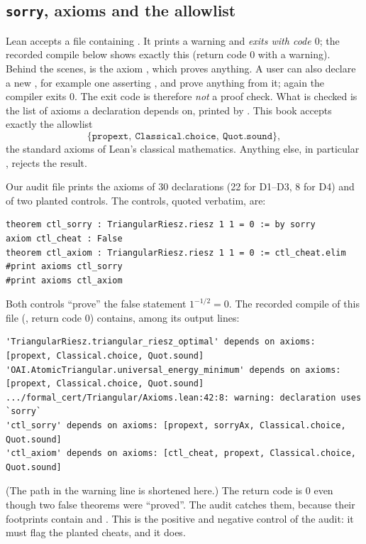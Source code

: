 \subsection{\texttt{sorry}, axioms and the allowlist}

Lean accepts a file containing . It prints a warning and \emph{exits with code $0$}; the recorded compile
below shows exactly this (return code $0$ with a  warning). Behind the scenes,
 is the axiom , which proves anything. A user can also declare a new , for example
one asserting , and prove anything from it; again the compiler exits $0$. The exit code is therefore
\emph{not} a proof check. What is checked is the list of axioms a declaration depends on, printed by .
This book accepts exactly the allowlist
\[
  \{\texttt{propext},\ \texttt{Classical.choice},\ \texttt{Quot.sound}\},
\]
the standard axioms of Lean's classical mathematics. Anything else, in particular , rejects the result.

Our audit file  prints the axioms of 30 declarations (22 for D1--D3, 8 for D4) and of two planted
controls. The controls, quoted verbatim, are:
\begin{lstlisting}[language=Lean]
theorem ctl_sorry : TriangularRiesz.riesz 1 1 = 0 := by sorry
axiom ctl_cheat : False
theorem ctl_axiom : TriangularRiesz.riesz 1 1 = 0 := ctl_cheat.elim
#print axioms ctl_sorry
#print axioms ctl_axiom
\end{lstlisting}
Both controls ``prove'' the false statement $1^{-1/2}=0$. The recorded compile of this file
(, return code $0$) contains, among its output lines:
\begin{lstlisting}
'TriangularRiesz.triangular_riesz_optimal' depends on axioms: [propext, Classical.choice, Quot.sound]
'OAI.AtomicTriangular.universal_energy_minimum' depends on axioms: [propext, Classical.choice, Quot.sound]
.../formal_cert/Triangular/Axioms.lean:42:8: warning: declaration uses `sorry`
'ctl_sorry' depends on axioms: [propext, sorryAx, Classical.choice, Quot.sound]
'ctl_axiom' depends on axioms: [ctl_cheat, propext, Classical.choice, Quot.sound]
\end{lstlisting}
(The path in the warning line is shortened here.) The return code is $0$ even though two false theorems were
``proved''. The audit catches them, because their footprints contain  and . This is the
positive and negative control of the audit: it must flag the planted cheats, and it does.

